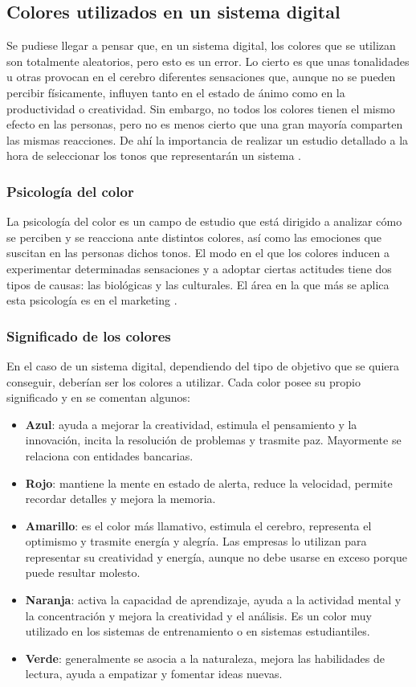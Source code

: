 \subsection{Colores utilizados en un sistema digital}
Se pudiese llegar a pensar que, en un sistema digital, los colores que se utilizan son totalmente aleatorios, pero esto es un error. Lo cierto es que unas tonalidades u otras provocan en el cerebro diferentes sensaciones que, aunque no se pueden percibir físicamente, influyen tanto en el estado de ánimo como en la productividad o creatividad. Sin embargo, no todos los colores tienen el mismo efecto en las personas, pero no es menos cierto que una gran mayoría comparten las mismas reacciones. De ahí la importancia de realizar un estudio detallado a la hora de seleccionar los tonos que representarán un sistema \cite{Paspuezan2022}.

\subsubsection{Psicología del color}
La psicología del color es un campo de estudio que está dirigido a analizar cómo se perciben y se reacciona ante distintos colores, así como las emociones que suscitan en las personas dichos tonos. El modo en el que los colores inducen a experimentar determinadas sensaciones y a adoptar ciertas actitudes tiene dos tipos de causas: las biológicas y las culturales. El área en la que más se aplica esta psicología es en el marketing \cite{Paspuezan2022}.

\subsubsection{Significado de los colores}
En el caso de un sistema digital, dependiendo del tipo de objetivo que se quiera conseguir, deberían ser los colores a utilizar. Cada color posee su propio significado y en \cite{TerronLopez2022} se comentan algunos:

\begin{itemize}
\item \textbf{Azul}: ayuda a mejorar la creatividad, estimula el pensamiento y la innovación, incita la resolución de problemas y trasmite paz. Mayormente se relaciona con entidades bancarias.
\item \textbf{Rojo}: mantiene la mente en estado de alerta, reduce la velocidad, permite recordar detalles y mejora la memoria.
\item \textbf{Amarillo}: es el color más llamativo, estimula el cerebro, representa el optimismo y trasmite energía y alegría. Las empresas lo utilizan para representar su creatividad y energía, aunque no debe usarse en exceso porque puede resultar molesto.
\item \textbf{Naranja}: activa la capacidad de aprendizaje, ayuda a la actividad mental y la concentración y mejora la creatividad y el análisis. Es un color muy utilizado en los sistemas de entrenamiento o en sistemas estudiantiles.
\item \textbf{Verde}: generalmente se asocia a la naturaleza, mejora las habilidades de lectura, ayuda a empatizar y fomentar ideas nuevas.
\end{itemize}

